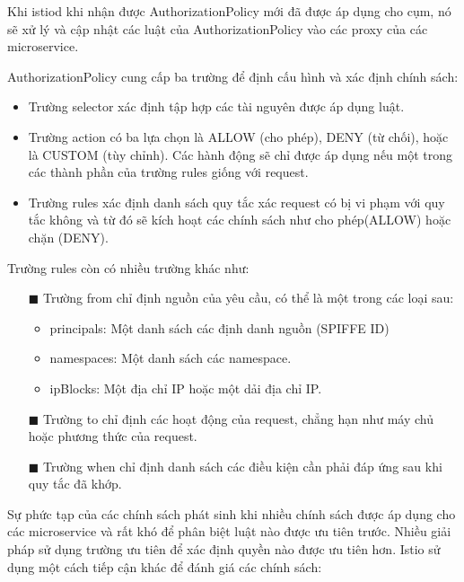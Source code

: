 \documentclass[14pt,a4paper]{book}
\begin{document}
{{			Khi istiod khi nhận được AuthorizationPolicy mới đã được áp dụng cho cụm, nó sẽ xử lý và cập nhật các luật của AuthorizationPolicy vào các proxy của các microservice.
			
			AuthorizationPolicy cung cấp ba trường để định cấu hình và xác định chính sách:
			
			\begin{itemize}
				\item Trường selector xác định tập hợp các tài nguyên được áp dụng luật.
				\item Trường action có ba lựa chọn là ALLOW (cho phép), DENY (từ chối), hoặc là CUSTOM (tùy chỉnh). Các hành động sẽ chỉ được áp dụng nếu một trong các thành phần của trường rules giống với request.
				\item Trường rules xác định danh sách quy tắc xác request có bị vi phạm với quy tắc không và từ đó sẽ kích hoạt các chính sách như cho phép(ALLOW) hoặc chặn (DENY).
			\end{itemize}
		
			Trường rules còn có nhiều trường khác như:
			\begin{enumerate}
				\item[$\blacksquare$] Trường from chỉ định nguồn của yêu cầu, có thể là một trong các loại sau:
				\begin{itemize}
					\item principals: Một danh sách các định danh nguồn (SPIFFE ID)
					\item namespaces: Một danh sách các namespace.
					\item ipBlocks: Một địa chỉ IP hoặc một dải địa chỉ IP.
				\end{itemize}
				\item[$\blacksquare$] Trường to chỉ định các hoạt động của request, chẳng hạn như máy chủ hoặc phương thức của request.
				\item[$\blacksquare$] Trường when chỉ định danh sách các điều kiện cần phải đáp ứng sau khi quy tắc đã khớp.
			\end{enumerate}
			
			Sự phức tạp của các chính sách phát sinh khi nhiều chính sách được áp dụng cho các microservice và rất khó để phân biệt luật nào được ưu tiên trước. Nhiều giải pháp sử dụng trường ưu tiên để xác định quyền nào được ưu tiên hơn. Istio sử dụng một cách tiếp cận khác để đánh giá các chính sách:
			
}}
\end{document}
